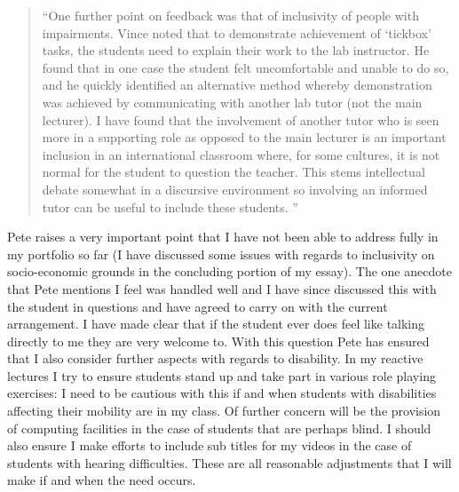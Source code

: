 \documentclass{article}
\begin{document}
\begin{quote}
``One further point on feedback was that of inclusivity of people with impairments. Vince noted that to demonstrate achievement of `tickbox' tasks, the students need to explain their work to the lab instructor. He found that in one case the student felt uncomfortable and unable to do so, and he quickly identified an alternative method whereby demonstration was achieved by communicating with another lab tutor (not the main lecturer). I have found that the involvement of another tutor who is seen more in a supporting role as opposed to the main lecturer is an important inclusion in an international classroom where, for some cultures, it is not normal for the student to question the teacher. This stems intellectual debate somewhat in a discursive environment so involving an informed tutor can be useful to include these students.  ''
\end{quote}

Pete raises a very important point that I have not been able to address fully in my portfolio so far (I have discussed some issues with regards to inclusivity on socio-economic grounds in the concluding portion of my essay). The one anecdote that Pete mentions I feel was handled well and I have since discussed this with the student in questions and have agreed to carry on with the current arrangement. I have made clear that if the student ever does feel like talking directly to me they are very welcome to. With this question Pete has ensured that I also consider further aspects with regards to disability. In my reactive lectures I try to ensure students stand up and take part in various role playing exercises: I need to be cautious with this if and when students with disabilities affecting their mobility are in my class. Of further concern will be the provision of computing facilities in the case of students that are perhaps blind. I should also ensure I make efforts to include sub titles for my videos in the case of students with hearing difficulties. These are all reasonable adjustments that I will make if and when the need occurs.
\end{document}
